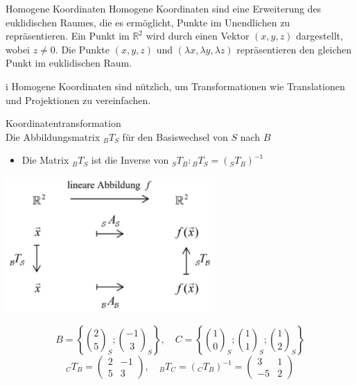 \begin{definition}{Homogene Koordinaten}
    Homogene Koordinaten sind eine Erweiterung des euklidischen Raumes, die es ermöglicht, Punkte im Unendlichen zu repräsentieren.
    Ein Punkt im $\mathbb{R}^2$ wird durch einen Vektor $(x, y, z)$ dargestellt, wobei $z\neq 0$.
    Die Punkte $(x, y, z)$ und $(\lambda x, \lambda y, \lambda z)$ repräsentieren den gleichen Punkt im euklidischen Raum.
    \begin{highlight}{i}
        Homogene Koordinaten sind nützlich, um Transformationen wie Translationen und Projektionen zu vereinfachen.
    \end{highlight}
    
\end{definition}

\begin{concept}{Koordinatentransformation}\\
    Die Abbildungsmatrix ${ }_{B} T_{S}$ für den Basiswechsel von $S$ nach $B$
    \begin{itemize}
    \item Die Matrix ${ }_{B} T_{S}$ ist die Inverse von ${ }_{S} T_{B}:{ }_{B} T_{S}=\left({ }_{S} T_{B}\right)^{-1}$
    \end{itemize}
    \begin{center}
    \includegraphics[width=0.6\textwidth]{koordinatentransformation.png}
    \end{center}
\end{concept}

\begin{example}
    $$
    B=\left\{\binom{2}{5}_{S} ;\binom{-1}{3}_{S}\right\}, \quad C=\left\{\binom{1}{0}_{S} ;\binom{1}{1}_{S} ;\binom{1}{2}_{S}\right\}
    $$
    $$
    { }_{C} T_{B}=\left(\begin{array}{cc}
    2 & -1 \\
    5 & 3
    \end{array}\right), \quad { }_{B} T_{C}=\left({ }_{C} T_{B}\right)^{-1}=\left(\begin{array}{cc}
    3 & 1 \\
    -5 & 2
    \end{array}\right)
    $$
\end{example}

